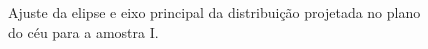 \begin{anexosenv}
\begin{figure}[H]
\caption{Ajuste da elipse e eixo principal da distribuição projetada no plano do céu para a amostra I.}
\label{fig:eixorotation}%
\end{figure}


\end{anexosenv}
